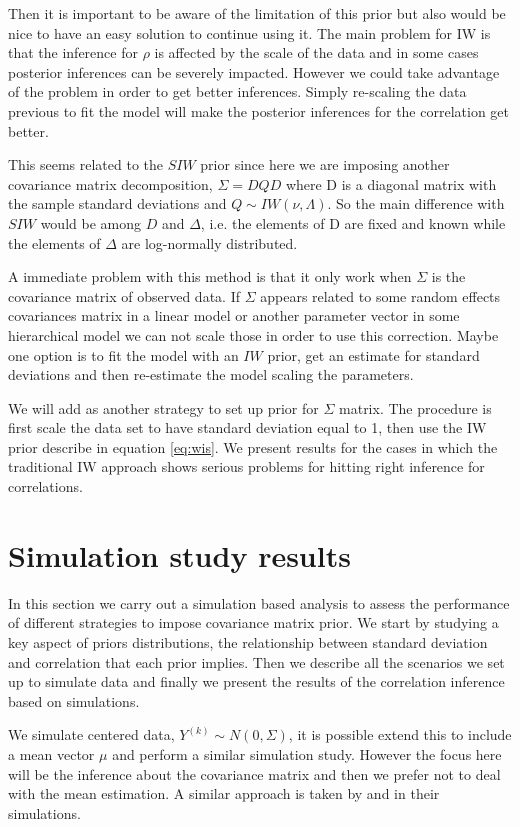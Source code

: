 \documentclass[a4paper]{article}
\begin{document}
Then it is important to be aware of the limitation of this prior but also would be nice to have an easy solution to continue using it. The main problem for IW is that the inference for $\rho$ is affected by the scale of the data and in some cases posterior inferences can be severely impacted. However we could take advantage of the problem in order to get better inferences. Simply re-scaling the data previous to fit the model will make the posterior inferences for the correlation get better. 

This seems related to the $SIW$ prior since here we are imposing another covariance matrix decomposition, $\Sigma = DQD$ where D is a diagonal matrix with the sample standard deviations and $Q\sim IW(\nu, \Lambda)$. So the main difference with $SIW$ would be among $D$ and $\Delta$, i.e. the elements of D are fixed and known while the elements of $\Delta$ are log-normally distributed. 

A immediate problem with this method is that it only work when $\Sigma$ is the covariance matrix of observed data. If $\Sigma$ appears related to some random effects covariances matrix in a linear model or another parameter vector in some hierarchical model we can not scale those in order to use this correction.  Maybe one option is to fit the model with an $IW$ prior, get an estimate for standard deviations and then re-estimate the model scaling the parameters.

We will add as another strategy to set up prior for $\Sigma$ matrix. The procedure is first scale the data set to have standard deviation equal to 1, then use the IW prior describe in equation \ref{eq:wis}. We present results for the cases in which the traditional IW approach shows serious problems for hitting right inference for correlations. 

\section{Simulation study results \label{sec:results}}

In this section we carry out a simulation based analysis to assess the performance of different strategies to impose covariance matrix prior. We start by studying a key aspect of priors distributions, the relationship between standard deviation and correlation that each prior implies. Then we describe all the scenarios we set up to simulate data and finally we present the results of the correlation inference based on simulations.  

We simulate centered data, $Y^{(k)}\sim N(0,\Sigma)$, it is possible extend this to include a mean vector $\mu$ and perform a similar simulation study. However the focus here will be the inference about the covariance matrix and then we prefer not to deal with the mean estimation. A similar approach is taken by  \cite{daniels1999} and \cite{matilde} in their simulations.
\end{document}
